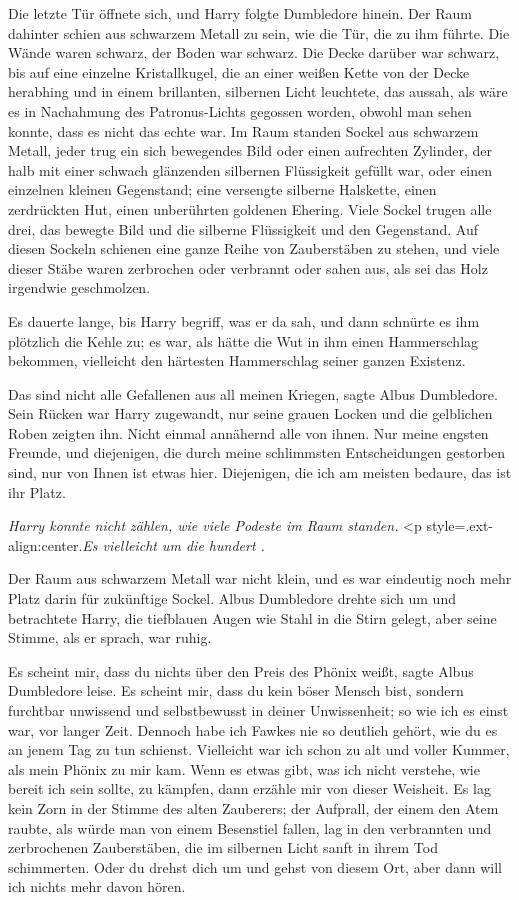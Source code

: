 Die letzte Tür öffnete sich, und Harry folgte Dumbledore hinein. Der Raum
dahinter schien aus schwarzem Metall zu sein, wie die Tür, die zu ihm führte.
Die Wände waren schwarz, der Boden war schwarz. Die Decke darüber war schwarz,
bis auf eine einzelne Kristallkugel, die an einer weißen Kette von der Decke
herabhing und in einem brillanten, silbernen Licht leuchtete, das aussah, als
wäre es in Nachahmung des Patronus-Lichts gegossen worden, obwohl man sehen
konnte, dass es nicht das echte war. Im Raum standen Sockel aus schwarzem
Metall, jeder trug ein sich bewegendes Bild oder einen aufrechten Zylinder, der
halb mit einer schwach glänzenden silbernen Flüssigkeit gefüllt war, oder einen
einzelnen kleinen Gegenstand; eine versengte silberne Halskette, einen
zerdrückten Hut, einen unberührten goldenen Ehering. Viele Sockel trugen alle
drei, das bewegte Bild und die silberne Flüssigkeit und den Gegenstand. Auf
diesen Sockeln schienen eine ganze Reihe von Zauberstäben zu stehen, und viele
dieser Stäbe waren zerbrochen oder verbrannt oder sahen aus, als sei das Holz
irgendwie geschmolzen.

Es dauerte lange, bis Harry begriff, was er da sah, und dann schnürte es ihm
plötzlich die Kehle zu; es war, als hätte die Wut in ihm einen Hammerschlag
bekommen, vielleicht den härtesten Hammerschlag seiner ganzen Existenz.

\glqq{}Das sind nicht alle Gefallenen aus all meinen Kriegen\grqq{}, sagte Albus
Dumbledore. Sein Rücken war Harry zugewandt, nur seine grauen Locken und die
gelblichen Roben zeigten ihn. \glqq{}Nicht einmal annähernd alle von ihnen. Nur
meine engsten Freunde, und diejenigen, die durch meine schlimmsten
Entscheidungen gestorben sind, nur von Ihnen ist etwas hier. Diejenigen, die ich
am meisten bedaure, das ist ihr Platz.\grqq{}

\emph{Harry konnte nicht zählen, wie
viele Podeste im Raum standen.}   <p
style=\grqq{}.ext-align:center\grqq{}.\emph{Es vielleicht um die hundert .}

Der Raum aus schwarzem Metall war nicht klein, und es war eindeutig noch mehr
Platz darin für zukünftige Sockel. Albus Dumbledore drehte sich um und
betrachtete Harry, die tiefblauen Augen wie Stahl in die Stirn gelegt, aber
seine Stimme, als er sprach, war ruhig.

\glqq{}Es scheint mir, dass du nichts über den Preis des Phönix weißt\grqq{},
sagte Albus Dumbledore leise. \glqq{}Es scheint mir, dass du kein böser Mensch
bist, sondern furchtbar unwissend und selbstbewusst in deiner Unwissenheit; so
wie ich es einst war, vor langer Zeit. Dennoch habe ich Fawkes nie so deutlich
gehört, wie du es an jenem Tag zu tun schienst. Vielleicht war ich schon zu alt
und voller Kummer, als mein Phönix zu mir kam. Wenn es etwas gibt, was ich nicht
verstehe, wie bereit ich sein sollte, zu kämpfen, dann erzähle mir von dieser
Weisheit.\grqq{} Es lag kein Zorn in der Stimme des alten Zauberers; der
Aufprall, der einem den Atem raubte, als würde man von einem Besenstiel fallen,
lag in den verbrannten und zerbrochenen Zauberstäben, die im silbernen Licht
sanft in ihrem Tod schimmerten. \glqq{}Oder du drehst dich um und gehst von
diesem Ort, aber dann will ich nichts mehr davon hören.\grqq{}

